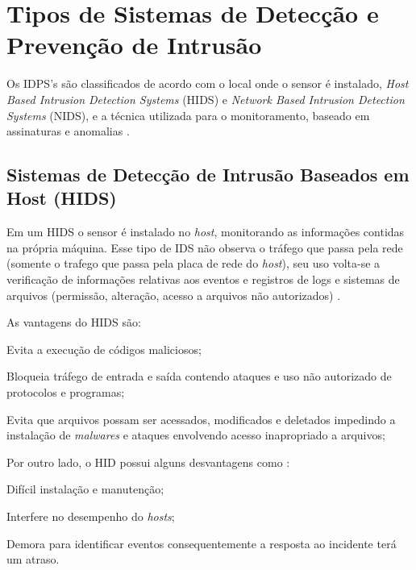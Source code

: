 \section{Tipos de Sistemas de Detecção e Prevenção de Intrusão} \label{sec:idps-tipos}

Os IDPS's são classificados de acordo com o local onde o sensor é instalado, \textit{Host Based Intrusion Detection Systems} (HIDS) e \textit{Network Based Intrusion Detection Systems} (NIDS), e a técnica utilizada para o monitoramento, baseado em assinaturas e anomalias \cite{nagahama2012ipsflow}.

\subsection{Sistemas de Detecção de Intrusão Baseados em Host (HIDS)}

Em um HIDS o sensor é instalado no \textit{host}, monitorando as informações contidas na própria máquina. Esse tipo de IDS não observa o tráfego que passa pela rede (somente o trafego que passa pela placa de rede do \textit{host}), seu uso volta-se a verificação de informações relativas aos eventos e registros de logs e sistemas de arquivos (permissão, alteração, acesso a arquivos não autorizados) \cite{nagahama2012ipsflow}.  

As vantagens do HIDS são: 

\begin{alineas}
\item Evita a execução de códigos maliciosos;
\item Bloqueia tráfego de entrada e saída contendo ataques e uso não autorizado de protocolos e programas;
\item Evita que arquivos possam ser acessados, modificados e deletados impedindo a instalação de \textit{malwares} e ataques envolvendo acesso inapropriado a arquivos;
\end{alineas}

Por outro lado, o HID possui alguns desvantagens como \cite{scarfone01}:  

\begin{alineas}
\item Difícil instalação e manutenção;
\item Interfere no desempenho do \textit{hosts};
\item Demora para identificar eventos consequentemente a resposta ao incidente terá um atraso.
\end{alineas}

